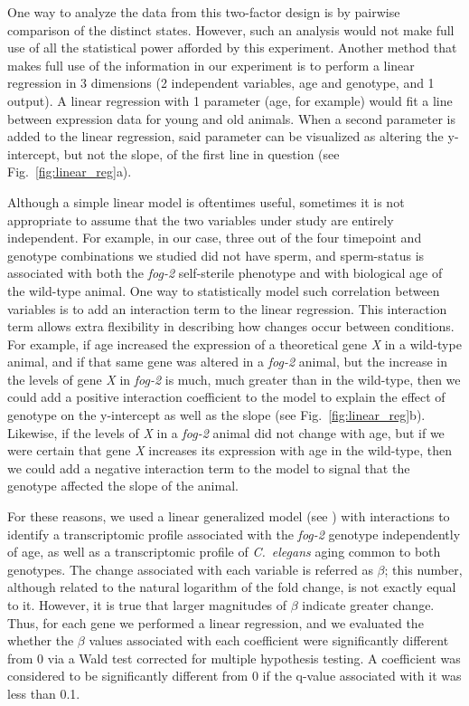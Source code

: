\documentclass[10pt,letterpaper,twocolumn]{article}
\newcommand{\cel}{\emph{C.~elegans}}
\newcommand{\fog}{\emph{\mbox{fog-2}}}
\begin{document}
One way to analyze the data from this two-factor design is by pairwise
comparison of the distinct states. However, such an analysis would not make full
use of all the statistical power afforded by this experiment. Another method
that makes full use of the information in our experiment is to perform a linear
regression in 3 dimensions (2 independent variables, age and genotype, and 1
output). A linear regression with 1 parameter (age, for example) would fit a
line between expression data for young and old animals. When a second parameter
is added to the linear regression, said parameter can be visualized as altering
the y-intercept, but not the slope, of the first line in question (see
Fig.~\ref{fig:linear_reg}a).

Although a simple linear model is oftentimes useful, sometimes it is not
appropriate to assume that the two variables under study are entirely
independent. For example, in our case, three out of the four timepoint and
genotype combinations we studied did not have sperm, and sperm-status is
associated with both the \fog{} self-sterile phenotype and with biological age
of the wild-type animal. One way to statistically model such correlation between
variables is to add an interaction term to the linear regression.
This interaction term allows extra flexibility in describing how changes occur
between conditions. For example, if age increased the expression of a
theoretical gene \emph{X} in a wild-type animal, and if that same gene was
altered in a \fog{} animal, but the increase in the levels of gene \emph{X} in
\fog{} is much, much greater than in the wild-type, then we could add a positive
interaction coefficient to the model to explain the effect of genotype on the
y-intercept as well as the slope (see Fig.~\ref{fig:linear_reg}b). Likewise, if
the levels of \emph{X} in a \fog{} animal did not change with age, but if we
were certain that gene \emph{X} increases its expression with age in the
wild-type, then we could add a negative interaction term to the model to signal
that the genotype affected the slope of the animal.

For these reasons, we used a linear generalized model (see )
with interactions to identify a transcriptomic profile associated with the
\fog{} genotype independently of age, as well as a transcriptomic profile of
\cel{} aging common to both genotypes. The change associated with each variable
is referred as $\beta$; this number, although related to the natural logarithm
of the fold change, is not exactly equal to it. However, it is true that larger
magnitudes of $\beta$ indicate greater change. Thus, for each gene we performed
a linear regression, and we evaluated the whether the $\beta$ values associated
with each coefficient were significantly different from 0 via a Wald test
corrected for multiple hypothesis testing. A coefficient was considered to be
significantly different from 0 if the q-value associated with it was less than
0.1.
\end{document}
